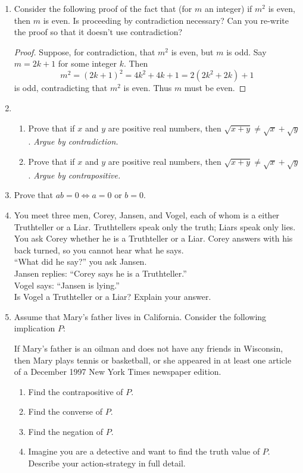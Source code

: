 \begin{enumerate}
    \item Consider the following proof of the fact that (for $m$ an integer) if $m^2$ is even, then $m$ is even. Is proceeding by contradiction necessary? Can you re-write the proof so that it doesn't use contradiction?
    
    \begin{proof}
        Suppose, for contradiction, that $m^2$ is even, but $m$ is odd. Say $m = 2k + 1$ for some integer $k$. Then
        \[
            m^2 = (2k + 1)^2 = 4k^2 + 4k + 1 = 2(2k^2 + 2k) + 1
        \]
        is odd, contradicting that $m^2$ is even. Thus $m$ must be even.
    \end{proof}	
    
    	\item \begin{enumerate} \item Prove that if $x$ and $y$ are positive real numbers, then $\sqrt{x+y}\neq\sqrt{x}+\sqrt{y}$. \emph{Argue by contradiction.}
     \item Prove that if $x$ and $y$ are positive real numbers, then $\sqrt{x+y}\neq\sqrt{x}+\sqrt{y}$. \emph{Argue by contrapositive.}
\end{enumerate}


	\item Prove that $ab=0\iff a=0$ or $b=0$.

  \item You meet three men, Corey, Jansen, and Vogel, each of whom is a either Truthteller or a Liar. Truthtellers speak only the truth; Liars speak only lies. You ask Corey whether he is a Truthteller or a Liar. Corey answers with his back turned, so you cannot hear what he says.\\[5pt]
``What did he say?'' you ask Jansen.\\[5pt]
Jansen replies: ``Corey says he is a Truthteller.''\\[5pt]
Vogel says: ``Jansen is lying.''\\[5pt]
Is Vogel a Truthteller or a Liar? Explain your answer.

	\item Assume that Mary's father lives in California. Consider the following implication $P$:
	\begin{center}
	If Mary's father is an oilman and does not have any friends in Wisconsin, then Mary plays tennis or basketball, or she appeared in at least one article of a December 1997 New York Times newspaper edition.
	\end{center}
	\begin{enumerate}
	  \item Find the contrapositive of $P$.
	  \item Find the converse of $P$.
	  \item Find the negation of $P$.
	  \item Imagine you are a detective and want to find the truth value of $P$. Describe your action-strategy in full detail.
	\end{enumerate}


\end{enumerate}
